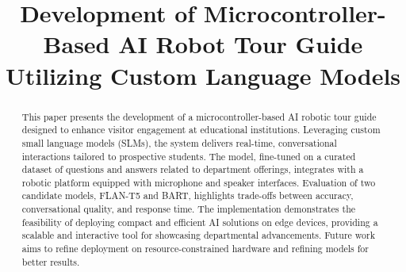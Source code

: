 \documentclass[conference]{IEEEtran}
\begin{document}
\title{Development of Microcontroller-Based AI Robot Tour Guide Utilizing Custom Language Models}


\author{
}

\maketitle
\thispagestyle{plain}
\pagestyle{plain}

\begin{abstract}
    This paper presents the development of a microcontroller-based AI robotic tour guide designed to enhance visitor engagement at educational institutions. 
    Leveraging custom small language models (SLMs), the system delivers real-time, conversational interactions tailored to prospective students. 
    The model, fine-tuned on a curated dataset of questions and answers related to department offerings, integrates with a robotic platform equipped with microphone and speaker interfaces. 
    Evaluation of two candidate models, FLAN-T5 and BART, highlights trade-offs between accuracy, conversational quality, and response time. 
    The implementation demonstrates the feasibility of deploying compact and efficient AI solutions on edge devices, providing a scalable and interactive tool for showcasing departmental advancements. 
    Future work aims to refine deployment on resource-constrained hardware and refining models for better results.
\end{abstract}
\end{document}
